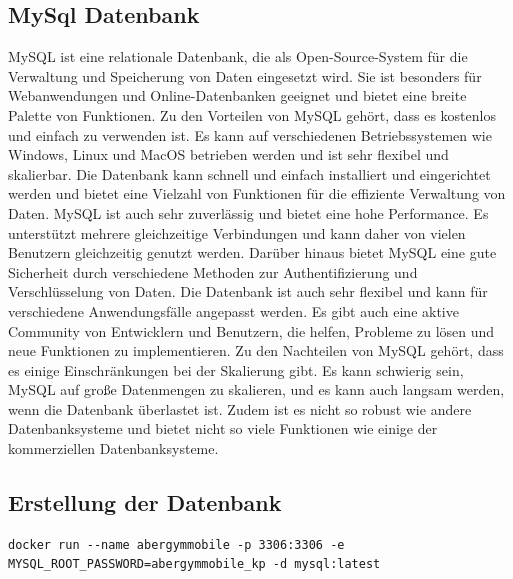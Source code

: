 \newpage
\subsection{MySql Datenbank}

MySQL ist eine relationale Datenbank, die als Open-Source-System für die Verwaltung und Speicherung von Daten eingesetzt wird. Sie ist besonders für Webanwendungen und Online-Datenbanken geeignet und bietet eine breite Palette von Funktionen.
\newline
\newline
Zu den Vorteilen von MySQL gehört, dass es kostenlos und einfach zu verwenden ist. Es kann auf verschiedenen Betriebssystemen wie Windows, Linux und MacOS betrieben werden und ist sehr flexibel und skalierbar. Die Datenbank kann schnell und einfach installiert und eingerichtet werden und bietet eine Vielzahl von Funktionen für die effiziente Verwaltung von Daten. MySQL ist auch sehr zuverlässig und bietet eine hohe Performance. Es unterstützt mehrere gleichzeitige Verbindungen und kann daher von vielen Benutzern gleichzeitig genutzt werden.
\newline
\newline
Darüber hinaus bietet MySQL eine gute Sicherheit durch verschiedene Methoden zur Authentifizierung und Verschlüsselung von Daten. Die Datenbank ist auch sehr flexibel und kann für verschiedene Anwendungsfälle angepasst werden. Es gibt auch eine aktive Community von Entwicklern und Benutzern, die helfen, Probleme zu lösen und neue Funktionen zu implementieren.
\newline
\newline
Zu den Nachteilen von MySQL gehört, dass es einige Einschränkungen bei der Skalierung gibt. Es kann schwierig sein, MySQL auf große Datenmengen zu skalieren, und es kann auch langsam werden, wenn die Datenbank überlastet ist. Zudem ist es nicht so robust wie andere Datenbanksysteme und bietet nicht so viele Funktionen wie einige der kommerziellen Datenbanksysteme.
\newpage

\subsection{Erstellung der Datenbank}

\begin{lstlisting}[caption=Erstellung der Datenbank mittels Docker Befehl,label=lst:impl:foo]
    docker run --name abergymmobile -p 3306:3306 -e MYSQL_ROOT_PASSWORD=abergymmobile_kp -d mysql:latest
\end{lstlisting}

